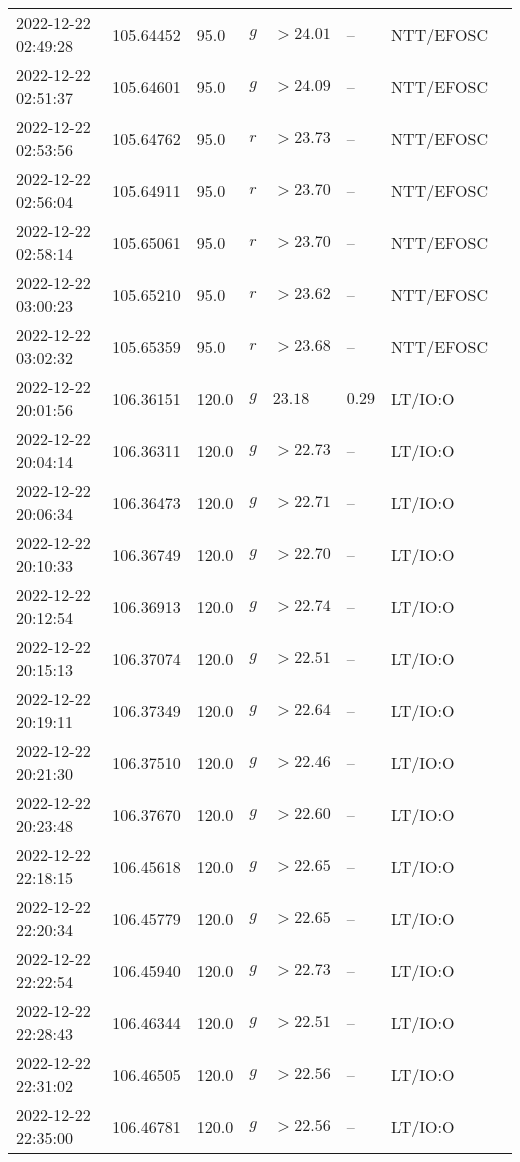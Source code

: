 \documentclass{nature_plusfigure}
\begin{document}
\begin{supplement}
\begin{center}
\begin{longtable}{llllllll}
2022-12-22 02:49:28 & 105.64452 & 95.0 & $g$ & $>24.01$ & -- & NTT/EFOSC &  \\ 
2022-12-22 02:51:37 & 105.64601 & 95.0 & $g$ & $>24.09$ & -- & NTT/EFOSC &  \\ 
2022-12-22 02:53:56 & 105.64762 & 95.0 & $r$ & $>23.73$ & -- & NTT/EFOSC &  \\ 
2022-12-22 02:56:04 & 105.64911 & 95.0 & $r$ & $>23.70$ & -- & NTT/EFOSC &  \\ 
2022-12-22 02:58:14 & 105.65061 & 95.0 & $r$ & $>23.70$ & -- & NTT/EFOSC &  \\ 
2022-12-22 03:00:23 & 105.65210 & 95.0 & $r$ & $>23.62$ & -- & NTT/EFOSC &  \\ 
2022-12-22 03:02:32 & 105.65359 & 95.0 & $r$ & $>23.68$ & -- & NTT/EFOSC &  \\ 
2022-12-22 20:01:56 & 106.36151 & 120.0 & $g$ & $23.18$ & $0.29$ & LT/IO:O &  \\ 
2022-12-22 20:04:14 & 106.36311 & 120.0 & $g$ & $>22.73$ & -- & LT/IO:O &  \\ 
2022-12-22 20:06:34 & 106.36473 & 120.0 & $g$ & $>22.71$ & -- & LT/IO:O &  \\ 
2022-12-22 20:10:33 & 106.36749 & 120.0 & $g$ & $>22.70$ & -- & LT/IO:O &  \\ 
2022-12-22 20:12:54 & 106.36913 & 120.0 & $g$ & $>22.74$ & -- & LT/IO:O &  \\ 
2022-12-22 20:15:13 & 106.37074 & 120.0 & $g$ & $>22.51$ & -- & LT/IO:O &  \\ 
2022-12-22 20:19:11 & 106.37349 & 120.0 & $g$ & $>22.64$ & -- & LT/IO:O &  \\ 
2022-12-22 20:21:30 & 106.37510 & 120.0 & $g$ & $>22.46$ & -- & LT/IO:O &  \\ 
2022-12-22 20:23:48 & 106.37670 & 120.0 & $g$ & $>22.60$ & -- & LT/IO:O &  \\ 
2022-12-22 22:18:15 & 106.45618 & 120.0 & $g$ & $>22.65$ & -- & LT/IO:O &  \\ 
2022-12-22 22:20:34 & 106.45779 & 120.0 & $g$ & $>22.65$ & -- & LT/IO:O &  \\ 
2022-12-22 22:22:54 & 106.45940 & 120.0 & $g$ & $>22.73$ & -- & LT/IO:O &  \\ 
2022-12-22 22:28:43 & 106.46344 & 120.0 & $g$ & $>22.51$ & -- & LT/IO:O &  \\ 
2022-12-22 22:31:02 & 106.46505 & 120.0 & $g$ & $>22.56$ & -- & LT/IO:O &  \\ 
2022-12-22 22:35:00 & 106.46781 & 120.0 & $g$ & $>22.56$ & -- & LT/IO:O &  \\ 

\end{longtable}
\end{center}
\end{supplement}
\end{document}
